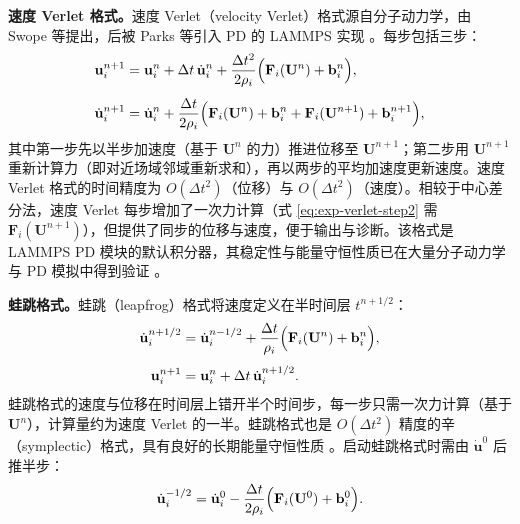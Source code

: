 \textbf{速度 Verlet 格式。}速度 Verlet（velocity Verlet）格式源自分子动力学，由 Swope 等提出，后被 Parks 等引入 PD 的 LAMMPS 实现 \cite{Parks2008}。每步包括三步：
\begin{align}
  \mathbf{u}_i^{n+1}
  &=\mathbf{u}_i^{n}
  +\Delta t\,\dot{\mathbf{u}}_i^{n}
  +\frac{\Delta t^{2}}{2\rho_i}
  \Bigl(\mathbf{F}_i(\mathbf{U}^{n})+\mathbf{b}_i^{n}\Bigr),
  \label{eq:exp-verlet-step1} \\[4pt]
  \dot{\mathbf{u}}_i^{n+1}
  &=\dot{\mathbf{u}}_i^{n}
  +\frac{\Delta t}{2\rho_i}
  \Bigl(\mathbf{F}_i(\mathbf{U}^{n})+\mathbf{b}_i^{n}
  +\mathbf{F}_i(\mathbf{U}^{n+1})+\mathbf{b}_i^{n+1}\Bigr),
  \label{eq:exp-verlet-step2}
\end{align}
其中第一步先以半步加速度（基于 $\mathbf{U}^{n}$ 的力）推进位移至 $\mathbf{U}^{n+1}$；第二步用 $\mathbf{U}^{n+1}$ 重新计算力（即对近场域邻域重新求和），再以两步的平均加速度更新速度。速度 Verlet 格式的时间精度为 $O(\Delta t^{2})$（位移）与 $O(\Delta t^{2})$（速度）。相较于中心差分法，速度 Verlet 每步增加了一次力计算（式 \eqref{eq:exp-verlet-step2} 需 $\mathbf{F}_i(\mathbf{U}^{n+1})$），但提供了同步的位移与速度，便于输出与诊断。该格式是 LAMMPS PD 模块的默认积分器，其稳定性与能量守恒性质已在大量分子动力学与 PD 模拟中得到验证 \cite{Parks2008}。

\textbf{蛙跳格式。}蛙跳（leapfrog）格式将速度定义在半时间层 $t^{n+1/2}$：
\begin{align}
  \dot{\mathbf{u}}_i^{n+1/2}
  &=\dot{\mathbf{u}}_i^{n-1/2}
  +\frac{\Delta t}{\rho_i}
  \Bigl(\mathbf{F}_i(\mathbf{U}^{n})+\mathbf{b}_i^{n}\Bigr),
  \label{eq:exp-leapfrog-velocity} \\[4pt]
  \mathbf{u}_i^{n+1}
  &=\mathbf{u}_i^{n}
  +\Delta t\,\dot{\mathbf{u}}_i^{n+1/2}.
  \label{eq:exp-leapfrog-displacement}
\end{align}
蛙跳格式的速度与位移在时间层上错开半个时间步，每一步只需一次力计算（基于 $\mathbf{U}^{n}$），计算量约为速度 Verlet 的一半。蛙跳格式也是 $O(\Delta t^{2})$ 精度的辛（symplectic）格式，具有良好的长期能量守恒性质 \cite{BelytschkoLiuMoran2000}。启动蛙跳格式时需由 $\dot{\mathbf{u}}^{0}$ 后推半步：
\begin{equation}
  \dot{\mathbf{u}}_i^{-1/2}
  =\dot{\mathbf{u}}_i^{0}
  -\frac{\Delta t}{2\rho_i}
  \Bigl(\mathbf{F}_i(\mathbf{U}^{0})+\mathbf{b}_i^{0}\Bigr).
  \label{eq:exp-leapfrog-startup}
\end{equation}

